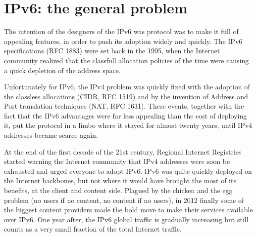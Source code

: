 \section{IPv6: the general problem}

The intention of the designers of the IPv6 was protocol was to make it full of appealing features, in order to push its adoption widely and quickly. The IPv6 specifications (RFC 1883) were set back in the 1995, when the Internet community realized that the classfull allocation policies of the time were causing a quick depletion of the address space. 
\par
Unfortunately for IPv6, the IPv4 problem was quickly fixed with the adoption of the classless allocations (CIDR, RFC 1519) and by the invention of Address and Port translation techniques (NAT, RFC 1631). These events, together with the fact that the IPv6 advantages were far less appealing than the cost of deploying it, put the protocol in a limbo where it stayed for almost twenty years, until IPv4 addresses became scarce again.
\par
At the end of the first decade of the 21st century, Regional Internet Registries started warning the Internet community that IPv4 addresses were soon be exhausted and urged everyone to adopt IPv6. IPv6 was quite quickly deployed on the Internet backbones, but not where it would have brought the most of its benefits, at the client and content side. 
Plagued by the chicken and the egg problem (no users if no content, no content if no users), in 2012 finally some of the 
biggest content providers made the bold move to make their services available over IPv6. 
One year after, the IPv6 global traffic is gradually increasing but still counts as a very small fraction of the 
total Internet traffic.

